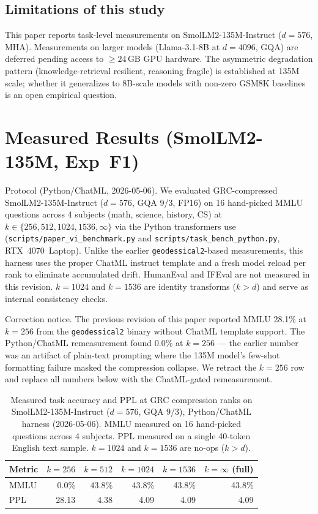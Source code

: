 \documentclass[11pt]{article}
\begin{document}
\subsection{Limitations of this study}
This paper reports task-level measurements on SmolLM2-135M-Instruct
($d{=}576$, MHA).  Measurements on larger models (Llama-3.1-8B at
$d{=}4096$, GQA) are deferred pending access to $\ge 24$\,GB GPU
hardware.  The asymmetric degradation pattern (knowledge-retrieval
resilient, reasoning fragile) is established at 135M scale; whether it
generalizes to 8B-scale models with non-zero GSM8K baselines is an
open empirical question.

\section{Measured Results (SmolLM2-135M, Exp~F1)}
\label{sec:measured-f1}

Protocol (Python/ChatML, 2026-05-06).  We evaluated
GRC-compressed SmolLM2-135M-Instruct ($d{=}576$, GQA 9/3, FP16) on
16 hand-picked MMLU questions across 4 subjects (math, science, history,
CS) at $k\in\{256,512,1024,1536,\infty\}$ via the Python transformers use
(\texttt{scripts/paper\_vi\_benchmark.py} and
\texttt{scripts/task\_bench\_python.py}, RTX~4070~Laptop).  Unlike the
earlier \texttt{geodessical2}-based measurements, this harness uses the
proper ChatML instruct template and a fresh model reload per rank to
eliminate accumulated drift.  HumanEval and IFEval are not measured in
this revision.  $k{=}1024$ and $k{=}1536$ are identity transforms
($k > d$) and serve as internal consistency checks.

Correction notice.  The previous revision of this paper reported
MMLU 28.1\% at $k{=}256$ from the \texttt{geodessical2} binary without
ChatML template support.  The Python/ChatML remeasurement found
0.0\% at $k{=}256$ --- the earlier number was an artifact of
plain-text prompting where the 135M model's few-shot formatting failure
masked the compression collapse.  We retract the $k{=}256$ row and
replace all numbers below with the ChatML-gated remeasurement.

\begin{table}[h]\centering\small
\caption{Measured task accuracy and PPL at GRC compression ranks on
SmolLM2-135M-Instruct ($d{=}576$, GQA 9/3), Python/ChatML harness (2026-05-06).
MMLU measured on 16 hand-picked questions across 4 subjects.
PPL measured on a single 40-token English text sample.
$k{=}1024$ and $k{=}1536$ are no-ops ($k > d$).}
\label{tab:f1-measured}
\begin{tabular}{@{}lrrrrr@{}}
\toprule
Metric  & $k{=}256$ & $k{=}512$ & $k{=}1024$ & $k{=}1536$ & $k{=}\infty$ (full) \\
\midrule
MMLU    & 0.0\%  & 43.8\% & 43.8\% & 43.8\% & 43.8\% \\
PPL     & 28.13 & 4.38  & 4.09  & 4.09  & 4.09 \\
\bottomrule
\end{tabular}
\end{table}
\end{document}
